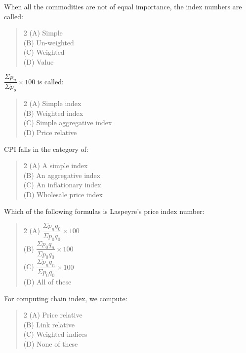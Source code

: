 \documentclass[11pt,a4paper]{article}
\begin{document}
\begin{mcqlist}
\item When all the commodities are not of equal importance, the index numbers are called:
\begin{quote}\begin{multicols}{2}
\noindent (A) Simple \\
(B) Un-weighted \\
(C) Weighted \\
(D) Value
\end{multicols}\end{quote}

\item $\dfrac{\Sigma p_n}{\Sigma p_o}\times 100$ is called:
\begin{quote}\begin{multicols}{2}
\noindent (A) Simple index \\
(B) Weighted index \\
(C) Simple aggregative index \\
(D) Price relative
\end{multicols}\end{quote}

\item CPI falls in the category of:
\begin{quote}\begin{multicols}{2}
\noindent (A) A simple index \\
(B) An aggregative index \\
(C) An inflationary index \\
(D) Wholesale price index
\end{multicols}\end{quote}

\item Which of the following formulas is Laspeyre's price index number:
\begin{quote}\begin{multicols}{2}
\noindent (A) $\dfrac{\Sigma p_nq_0}{\Sigma p_0q_0}\times 100$ \\
(B) $\dfrac{\Sigma p_0q_n}{\Sigma p_0q_0}\times 100$ \\
(C) $\dfrac{\Sigma p_nq_n}{\Sigma p_0q_0}\times 100$ \\
(D) All of these
\end{multicols}\end{quote}

\item For computing chain index, we compute:
\begin{quote}\begin{multicols}{2}
\noindent (A) Price relative \\
(B) Link relative \\
(C) Weighted indices \\
(D) None of these
\end{multicols}\end{quote}


\end{mcqlist}
\end{document}
